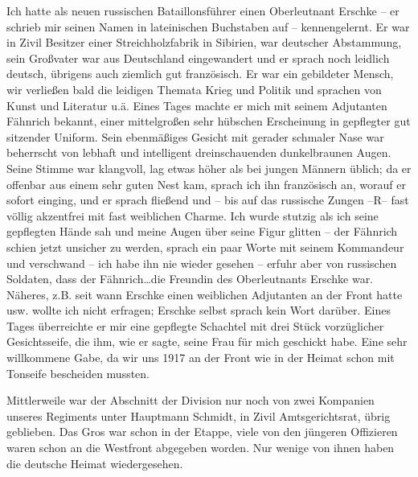 Ich hatte als neuen russischen Bataillonsführer einen Oberleutnant Erschke -- er schrieb mir seinen Namen in lateinischen Buchstaben auf -- kennengelernt. Er war in Zivil Besitzer einer Streichholzfabrik in Sibirien, war deutscher Abstammung, sein Großvater war aus Deutschland eingewandert und er sprach noch leidlich deutsch, übrigens auch ziemlich gut französisch. Er war ein gebildeter Mensch, wir verließen bald die leidigen Themata Krieg und Politik und sprachen von Kunst und Literatur u.ä. Eines Tages machte er mich mit seinem Adjutanten Fähnrich bekannt, einer mittelgroßen sehr hübschen Erscheinung in gepflegter gut sitzender Uniform. Sein ebenmäßiges Gesicht mit gerader schmaler Nase war beherrscht von lebhaft und intelligent dreinschauenden dunkelbraunen Augen. Seine Stimme war klangvoll, lag etwas höher als bei jungen Männern üblich; da er offenbar aus einem sehr guten Nest kam, sprach ich ihn französisch an, worauf er sofort einging, und er sprach fließend und -- bis auf das russische Zungen --R-- fast völlig akzentfrei mit fast weiblichen Charme. Ich wurde stutzig als ich seine gepflegten Hände sah und meine Augen über seine Figur glitten -- der Fähnrich schien jetzt unsicher zu werden, sprach ein paar Worte mit seinem Kommandeur und verschwand -- ich habe ihn nie wieder gesehen -- erfuhr aber von russischen Soldaten, dass der Fähnrich\dots die Freundin des Oberleutnants Erschke war. Näheres, z.B. seit wann Erschke einen weiblichen Adjutanten an der Front hatte usw. wollte ich nicht erfragen; Erschke selbst sprach kein Wort darüber. Eines Tages überreichte er mir eine gepflegte Schachtel mit drei Stück vorzüglicher Gesichtsseife, die ihm, wie er sagte, seine Frau für mich geschickt habe. Eine sehr willkommene Gabe, da wir uns 1917 an der Front wie in der Heimat schon mit Tonseife bescheiden mussten.

Mittlerweile war der Abschnitt der Division nur noch von zwei Kompanien unseres Regiments unter Hauptmann Schmidt, in Zivil Amtsgerichtsrat, übrig geblieben. Das Gros war schon in der Etappe, viele von den jüngeren Offizieren waren schon an die Westfront abgegeben worden. Nur wenige von ihnen haben die deutsche Heimat wiedergesehen.

